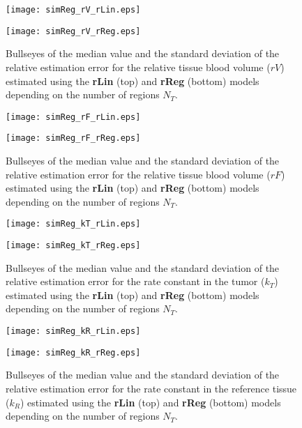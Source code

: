 \begin{subfigures}
    \begin{figure}\centering
        \texttt{[image: simReg\_rV\_rLin.eps]}
        \par%
        \texttt{[image: simReg\_rV\_rReg.eps]}
        \caption{Bullseyes of the median value and the standard deviation of the relative estimation error for the relative tissue blood volume ($rV$) estimated using the \textbf{rLin} (top) and \textbf{rReg} (bottom) models depending on the number of regions $N_T$.}
        \label{fig:region_rV}
    \end{figure}
    \begin{figure}\centering
        \texttt{[image: simReg\_rF\_rLin.eps]}
        \par%
        \texttt{[image: simReg\_rF\_rReg.eps]}
        \caption{Bullseyes of the median value and the standard deviation of the relative estimation error for the relative tissue blood volume ($rF$) estimated using the \textbf{rLin} (top) and \textbf{rReg} (bottom) models depending on the number of regions $N_T$.}
        \label{fig:region_rF}
    \end{figure}
    \begin{figure}\centering
        \texttt{[image: simReg\_kT\_rLin.eps]}
        \par%
        \texttt{[image: simReg\_kT\_rReg.eps]}
        \caption{Bullseyes of the median value and the standard deviation of the relative estimation error for the rate constant in the tumor ($k_T$) estimated using the \textbf{rLin} (top) and \textbf{rReg} (bottom) models depending on the number of regions $N_T$.}
        \label{fig:region_kT}
    \end{figure}
    \begin{figure}\centering
        \texttt{[image: simReg\_kR\_rLin.eps]}
        \par%
        \texttt{[image: simReg\_kR\_rReg.eps]}
        \caption{Bullseyes of the median value and the standard deviation of the relative estimation error for the rate constant in the reference tissue ($k_R$) estimated using the \textbf{rLin} (top) and \textbf{rReg} (bottom) models depending on the number of regions $N_T$.}
        \label{fig:region_kR}
        \end{figure}
\end{subfigures}

